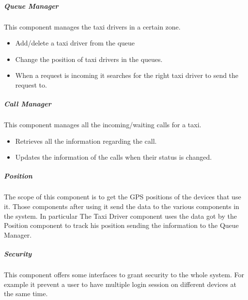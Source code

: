 \subparagraph{Queue Manager}
This component manages the taxi drivers in a certain zone.
\begin{itemize}
    \item Add/delete a taxi driver from the queue
    \item Change the position of taxi drivers in the queues.
    \item When a request is incoming it searches for the right taxi driver to send the request to.
\end{itemize}

\subparagraph{Call Manager}
This component manages all the incoming/waiting calls for a taxi.
\begin{itemize}
    \item Retrieves all the information regarding the call.
    \item Updates the information of the calls when their status is changed.
\end{itemize}

\subparagraph{Position}
The scope of this component is to get the GPS positions of the devices that use it. Those components after using it send the data to the various components in the system. In particular The Taxi Driver component uses the data got by the Position component to track his position sending the information to the Queue Manager.

\subparagraph{Security}
This component offers some interfaces to grant security to the whole system.
For example  it prevent a user to have multiple login session on different devices at the same time.
